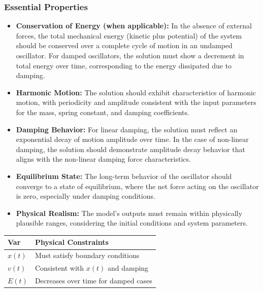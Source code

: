 \documentclass[12pt]{article}
\begin{document}
\subsubsection*{Essential Properties}

\begin{itemize}
  \item \textbf{Conservation of Energy (when applicable):} In the absence of external 
  forces, the total mechanical energy (kinetic plus potential) of the system 
  should be conserved over a complete cycle of motion in an undamped 
  oscillator. For damped oscillators, the solution must show a decrement in 
  total energy over time, corresponding to the energy dissipated due to damping.
  \item \textbf{Harmonic Motion:} The solution should exhibit characteristics of 
  harmonic motion, with periodicity and amplitude consistent with the input 
  parameters for the mass, spring constant, and damping coefficients.
  \item \textbf{Damping Behavior:} For linear damping, the solution must reflect an 
  exponential decay of motion amplitude over time. In the case of non-linear 
  damping, the solution should demonstrate amplitude decay behavior that 
  aligns with the non-linear damping force characteristics.
  \item \textbf{Equilibrium State:} The long-term behavior of the oscillator should 
  converge to a state of equilibrium, where the net force acting on the 
  oscillator is zero, especially under damping conditions.
  \item \textbf{Physical Realism:} The model's outputs must remain within physically 
  plausible ranges, considering the initial conditions and system parameters.
\end{itemize}

\begin{table}[!h]
\caption{Output Variables} \label{TblOutputVar}
\renewcommand{\arraystretch}{1.2}
\noindent \begin{longtable*}{l l} 
  \toprule
  \textbf{Var} & \textbf{Physical Constraints} \\
  \midrule 
  $x(t)$ & Must satisfy boundary conditions\\
  $v(t)$ & Consistent with $x(t)$ and damping\\
  $E(t)$ & Decreases over time for damped cases\\
  \bottomrule
\end{longtable*}
\end{table}
\end{document}
